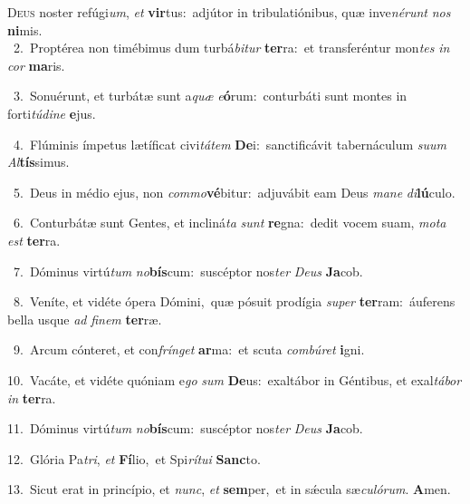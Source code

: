 \lettrine{\initial\textcolor{\initialcolor}{D}}{eus} noster refúgi\-\textit{um}\-, \textit{et} \textbf{vir}\-tus:~\star adjútor in tribulatiónibus, quæ inve\-\textit{né}\-\textit{runt} \textit{nos} \textbf{ni}\-mis.\\
{\numbfont\textcolor{\numbcolor}{~2.}}~Proptérea non timébimus dum turbá\-\textit{bi}\-\textit{tur} \textbf{ter}\-ra:~\star et transferéntur mon\textit{tes} \textit{in} \textit{cor} \textbf{ma}\-ris.\par
{\numbfont\textcolor{\numbcolor}{~3.}}~Sonuérunt, et turbátæ sunt a\textit{quæ} \textit{e}\-\textbf{ó}rum:~\star conturbáti sunt montes in forti\-\textit{tú}\-\textit{di}\textit{ne} \textbf{e}\-jus.\par
{\numbfont\textcolor{\numbcolor}{~4.}}~Flúminis ímpetus lætíficat civi\-\textit{tá}\-\textit{tem} \textbf{De}\-i:~\star sanctificávit tabernáculum \textit{su}\-\textit{um} \textit{Al}\-\textbf{tís}simus.\par
{\numbfont\textcolor{\numbcolor}{~5.}}~Deus in médio ejus, non \textit{com}\-\textit{mo}\textbf{vé}bitur:~\star adjuvábit eam Deus \textit{ma}\-\textit{ne} \textit{di}\-\textbf{lú}culo.\par
{\numbfont\textcolor{\numbcolor}{~6.}}~Conturbátæ sunt Gentes, et incliná\textit{ta} \textit{sunt} \textbf{re}\-gna:~\star dedit vocem suam, \textit{mo}\-\textit{ta} \textit{est} \textbf{ter}\-ra.\par
{\numbfont\textcolor{\numbcolor}{~7.}}~Dóminus virtú\textit{tum} \textit{no}\-\textbf{bís}cum:~\star suscéptor nos\textit{ter} \textit{De}\-\textit{us} \textbf{Ja}\-cob.\par
{\numbfont\textcolor{\numbcolor}{~8.}}~Veníte, et vidéte ópera Dómini,~\dagger quæ pósuit prodígia \textit{su}\-\textit{per} \textbf{ter}\-ram:~\star áuferens bella usque \textit{ad} \textit{fi}\-\textit{nem} \textbf{ter}\-ræ.\par
{\numbfont\textcolor{\numbcolor}{~9.}}~Arcum cónteret, et con\-\textit{frín}\-\textit{get} \textbf{ar}\-ma:~\star et scuta \textit{com}\-\textit{bú}\textit{ret} \textbf{i}\-gni.\par
{\numbfont\textcolor{\numbcolor}{10.}}~Vacáte, et vidéte quóniam e\textit{go} \textit{sum} \textbf{De}\-us:~\star exaltábor in Géntibus, et exal\-\textit{tá}\-\textit{bor} \textit{in} \textbf{ter}\-ra.\par
{\numbfont\textcolor{\numbcolor}{11.}}~Dóminus virtú\textit{tum} \textit{no}\-\textbf{bís}cum:~\star suscéptor nos\textit{ter} \textit{De}\-\textit{us} \textbf{Ja}\-cob.\par
{\numbfont\textcolor{\numbcolor}{12.}}~Glória Pa\-\textit{tri}\-, \textit{et} \textbf{Fí}\-lio,~\star et Spi\-\textit{rí}\-\textit{tu}\textit{i} \textbf{Sanc}\-to.\par
{\numbfont\textcolor{\numbcolor}{13.}}~Sicut erat in princípio, et \textit{nunc}\-, \textit{et} \textbf{sem}\-per,~\star et in sǽcula sæ\-\textit{cu}\-\textit{ló}\textit{rum}. \textbf{A}\-men.\par
